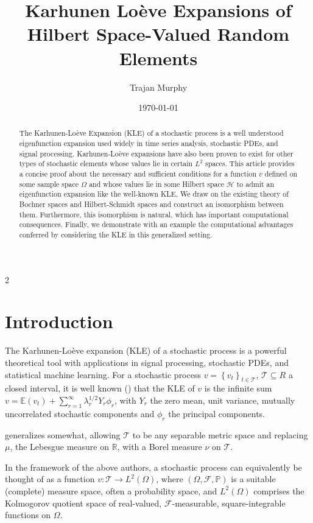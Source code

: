 \documentclass{article}
\title{Karhunen Lo\`eve Expansions of Hilbert Space-Valued Random Elements}
\author{Trajan Murphy}
\date{\today}
\numberwithin{theorem}{section}
\numberwithin{lemma}{section}
\numberwithin{definition}{section}
\numberwithin{assumption}{section}
\numberwithin{proposition}{section}
\numberwithin{remark}{section}
\numberwithin{corollary}{section}
\numberwithin{conjecture}{section}
\numberwithin{example}{section}
\newcommand{\R}{\mathbb{R}}
\newcommand{\E}{\mathbb{E}}
\newcommand{\bset}[1]{\left \lbrace #1 \right \rbrace}
\newcommand{\CH}{\mathcal H}
\begin{document}
\begin{multicols*}{2}
\maketitle

\begin{abstract}
    The Karhunen-Lo\`eve Expansion (KLE) of a stochastic process is a well understood eigenfunction expansion used widely in time series analysis, stochastic PDEs, and signal processing. Karhunen-Lo\`eve expansions have also been proven to exist for other types of stochastic elements whose values lie in certain $L^2$ spaces. This article provides a concise proof about the necessary and sufficient conditions for a function $v$ defined on some sample space $\Omega$ and whose values lie in some Hilbert space $\CH$ to admit an eigenfunction expansion like the well-known KLE. We draw on the existing theory of Bochner spaces and Hilbert-Schmidt spaces and construct an isomorphism between them. Furthermore, this isomorphism is natural, which has important computational consequences. Finally, we demonstrate with an example the computational advantages conferred by considering the KLE in this generalized setting. 
\end{abstract}

\section{Introduction}

The Karhunen-Lo\`eve expansion (KLE) of a stochastic process is a powerful theoretical tool with applications in signal processing, stochastic PDEs, and statistical machine learning. For a stochastic process $v = \bset{v_t}_{t \in \mathcal T}$, $\mathcal T \subseteq R$ a closed interval, it is well known (\cite{Aadithya2018,  Giambartolomei2015, alexanderian2015, chien1967}) that the KLE of $v$ is the infinite sum $v = \E(v_t) + \sum_{r=1}^\infty \lambda_r^{1/2} Y_r \phi_r$, with $Y_r$ the zero mean, unit variance, mutually uncorrelated stochastic components and $\phi_r$ the principal components. 

\parencite{steinwart2017} generalizes somewhat, allowing $\mathcal T$ to be any separable metric space and replacing $\mu$, the Lebesgue measure on $\R$, with a Borel measure $\nu$ on $\mathcal T$. 

In the framework of the above authors, a stochastic process can equivalently be thought of as a function $v: \mathcal T \to L^2(\Omega)$, where $(\Omega, \mathcal F, \mathbb P)$ is a suitable (complete) measure space, often a probability space, and $L^2(\Omega)$ comprises the Kolmogorov quotient space of real-valued, $\mathcal F$-measurable, square-integrable functions on $\Omega$. 


\end{multicols*}
\end{document}
